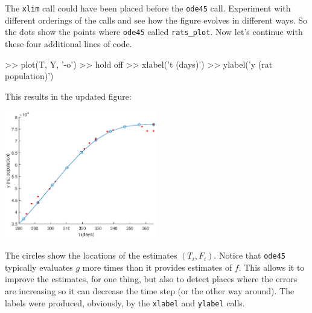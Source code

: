 \documentclass[
]{book}
\numberwithin{Answer}{chapter}
\numberwithin{Exercise}{chapter}
\begin{document}
The {\tt xlim} call could have been placed before the {\tt ode45} call.  Experiment with different orderings of the calls and see how the figure evolves in different ways.  So the dots show the points where {\tt ode45} called {\tt rats\_plot}.  Now let's continue with these four additional lines of code.

\begin{code}
>> plot(T, Y, '-o')
>> hold off
>> xlabel('t (days)')
>> ylabel('y (rat population)')
\end{code}

This results in the updated figure:  

\beforefig \centerline{\includegraphics[height=2.2in]{figs/ode45plotLabel.eps}}

The circles show the locations of the estimates
$(T_i, F_i)$.  Notice that {\tt ode45} typically evaluates
$g$ 
more times than it provides estimates of $f$.  This allows it to improve the
estimates, for one thing, but also to detect places where the errors
are increasing so it can decrease the time step (or the other
way around).  The labels were produced, obviously, by the {\tt xlabel} and {\tt ylabel} calls.
\end{document}
